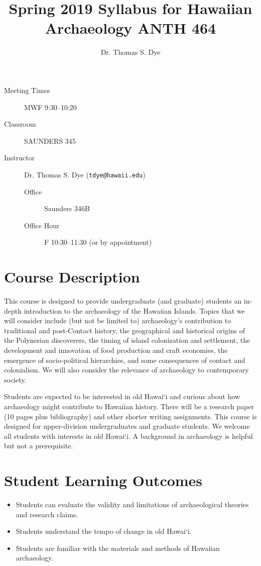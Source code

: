 \documentclass{scrartcl}
\author{Dr. Thomas S. Dye}
\date{}
\title{Spring 2019 Syllabus for Hawaiian Archaeology ANTH 464}
\begin{document}
\maketitle
\tableofcontents

\begin{description}
\item[{Meeting Times}] MWF 9:30--10:20
\item[{Classroom}] SAUNDERS 345
\item[{Instructor}] Dr. Thomas S. Dye (\texttt{tdye@hawaii.edu})
\begin{description}
\item[{Office}] Saunders 346B
\item[{Office Hour}] F 10:30--11:30 (or by appointment)
\end{description}
\end{description}


\section{Course Description}
\label{sec:org89314a9}

This course is designed to provide undergraduate (and graduate)
students an in-depth introduction to the archaeology of the Hawaiian
Islands. Topics that we will consider include (but not be limited to)
archaeology's contribution to traditional and post-Contact history,
the geographical and historical origins of the Polynesian discoverers,
the timing of island colonization and settlement, the development and
innovation of food production and craft economies, the emergence of
socio-political hierarchies, and some consequences of contact and
colonialism.  We will also consider the relevance of archaeology to
contemporary society.

Students are expected to be interested in old Hawai`i and curious
about how archaeology might contribute to Hawaiian history.  There
will be a research paper (10 pages plus bibliography) and other
shorter writing assignments. This course is designed for
upper-division undergraduates and graduate students. We welcome all
students with interests in old Hawai`i. A background in archaeology is
helpful but not a prerequisite.

\section{Student Learning Outcomes}
\label{sec:orgb73d35d}
\begin{itemize}
\item Students can evaluate the validity and limitations of
archaeological theories and research claims.
\item Students understand the tempo of change in old Hawai`i.
\item Students are familiar with the materials and methods of Hawaiian
archaeology.
\end{itemize}
\end{document}
